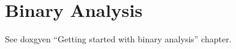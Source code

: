 \chapter{Binary Analysis}


See doxgyen ``Getting started with binary analysis'' chapter.











